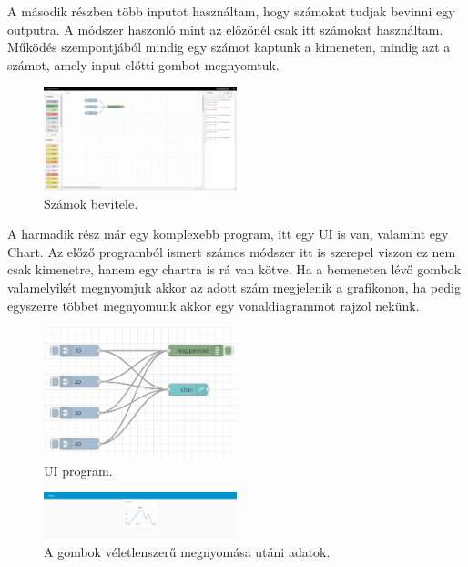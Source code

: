 \documentclass[a4paper,12pt,oneside]{report}
\begin{document}
A második részben több inputot használtam, hogy számokat tudjak bevinni egy outputra. A módszer haszonló mint az előzőnél
csak itt számokat használtam. Működés szempontjából mindig egy számot kaptunk a kimeneten, mindig azt a számot, amely input előtti
gombot megnyomtuk.

\begin{figure}[htbp]
	\centering
	\includegraphics[width=0.5\textwidth]{fig/Numbers.png}
	\caption{Számok bevitele.}
	\label{fig-Numbers}
\end{figure}

A harmadik rész már egy komplexebb program, itt egy UI is van, valamint egy Chart. Az előző programból ismert számos módszer
itt is szerepel viszon ez nem csak kimenetre, hanem egy chartra is rá van kötve. Ha a bemeneten lévő gombok valamelyikét megnyomjuk 
akkor az adott szám megjelenik a grafikonon, ha pedig egyszerre többet megnyomunk akkor egy vonaldiagrammot rajzol nekünk.

\begin{figure}[htbp]
	\centering
	\includegraphics[width=0.5\textwidth]{fig/uichart.png}
	\caption{UI program.}
	\label{fig-uichart}
\end{figure}

\begin{figure}[htbp]
	\centering
	\includegraphics[width=0.5\textwidth]{fig/chart.png}
	\caption{A gombok véletlenszerű megnyomása utáni adatok.}
	\label{fig-chart}
\end{figure}
\end{document}

